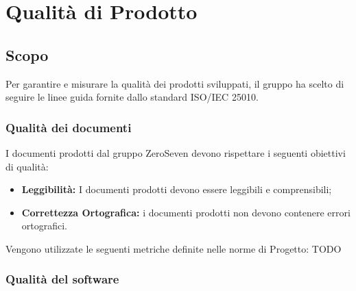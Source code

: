 \chapter{Qualità di Prodotto}
\section{Scopo}
Per garantire e misurare la qualità dei prodotti sviluppati, il gruppo ha scelto di seguire le linee guida fornite dallo standard ISO/IEC 25010.\\
\subsection{Qualità dei documenti}
I documenti prodotti dal gruppo ZeroSeven devono rispettare i seguenti obiettivi di qualità:
\begin{itemize}
    \item \textbf{Leggibilità:} I documenti prodotti devono essere leggibili e comprensibili;
    \item \textbf{Correttezza Ortografica:} i documenti prodotti non devono contenere errori ortografici.
\end{itemize}
Vengono utilizzate le seguenti metriche definite nelle norme di Progetto:
TODO

\subsection{Qualità del software}

